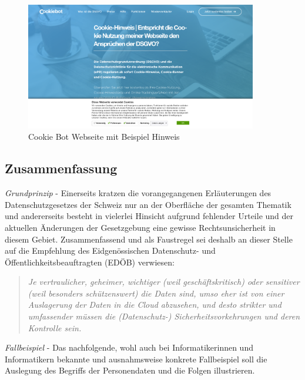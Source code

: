 \documentclass[a4paper,pointlessnumbers]{scrreprt}
\begin{document}
\begin{figure}[H]
\begin{center}
\includegraphics[width=0.9\textwidth]{images/cookiebot.pdf}
\caption{Cookie Bot Webseite mit Beispiel Hinweis}
\end{center}
\end{figure}

\subsection{Zusammenfassung}
\textit{Grundprinzip} - Einerseits kratzen die vorangegangenen Erläuterungen des Datenschutzgesetzes der Schweiz nur an der Oberfläche der gesamten Thematik und andererseits besteht in vielerlei Hinsicht aufgrund fehlender Urteile und der aktuellen Änderungen der Gesetzgebung eine gewisse Rechtsunsicherheit in diesem Gebiet. Zusammenfassend und als Faustregel sei deshalb an dieser Stelle auf die Empfehlung des Eidgenössischen Datenschutz- und Öffentlichkeitsbeauftragten (EDÖB) verwiesen:
\begin{quote}
\textit{Je vertraulicher, geheimer, wichtiger (weil geschäftskritisch) oder sensitiver (weil besonders schützenswert) die Daten sind, umso eher ist von einer Auslagerung der Daten in die Cloud abzusehen, und desto strikter und umfassender müssen die (Datenschutz-) Sicherheitsvorkehrungen und deren Kontrolle sein.}
\end{quote}

\textit{Fallbeispiel} - Das nachfolgende, wohl auch bei Informatikerinnen und Informatikern bekannte und ausnahmsweise konkrete Fallbeispiel soll die Auslegung des Begriffs der Personendaten und die Folgen illustrieren.
\end{document}
